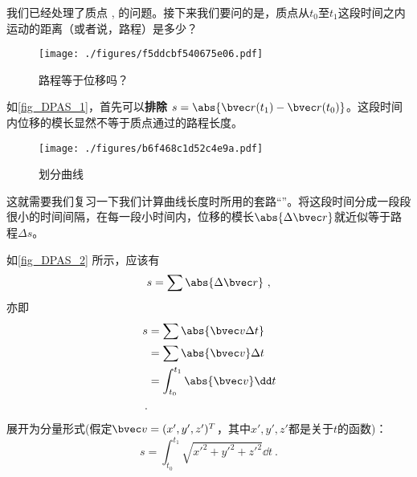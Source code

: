 

我们已经处理了质点 , 的问题。接下来我们要问的是，质点从$t_0$至$t_1$这段时间之内运动的距离（或者说，路程）是多少？

\begin{figure}[ht]
\centering
\texttt{[image: ./figures/f5ddcbf540675e06.pdf]}
\caption{路程等于位移吗？} \label{fig_DPAS_1}
\end{figure}

如\autoref{fig_DPAS_1}，首先可以\textbf{排除} $s = \abs{\bvec r(t_1) - \bvec r(t_0)}  $。这段时间内位移的模长显然不等于质点通过的路程长度。

\begin{figure}[ht]
\centering
\texttt{[image: ./figures/b6f468c1d52c4e9a.pdf]}
\caption{划分曲线} \label{fig_DPAS_2}
\end{figure}

这就需要我们复习一下我们计算曲线长度时所用的套路“”。将这段时间分成一段段很小的时间间隔，在每一段小时间内，位移的模长$\abs{\Delta \bvec r}$就近似等于路程$\Delta s$。

如\autoref{fig_DPAS_2} 所示，应该有 $$s=\sum \abs{\Delta \bvec r}~,$$
亦即
$$
\begin{aligned}
s&=\sum \abs{\bvec v \Delta t}\\
&=\sum \abs{\bvec v} \Delta t\\
&=\int _{t_0}^{t_1} \abs{\bvec v} \dd t\\~.
\end{aligned}
$$
展开为分量形式(假定$\bvec v = (x',y',z')^T$，其中$x',y',z'$都是关于$t$的函数)：
$$
s = \int _{t_0}^{t_1} \sqrt{x'^2+y'^2+z'^2} \dd t~.
$$
